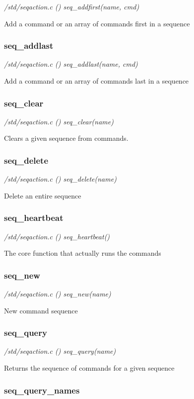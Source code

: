 {\em /std/seqaction.c () seq\_addfirst(name, cmd)}

Add a command or an array of commands first in a sequence


\subsubsection{seq\_addlast}

{\em /std/seqaction.c () seq\_addlast(name, cmd)}

Add a command or an array of commands last in a sequence 


\subsubsection{seq\_clear}

{\em /std/seqaction.c () seq\_clear(name)}

Clears a given sequence from commands.


\subsubsection{seq\_delete}

{\em /std/seqaction.c () seq\_delete(name)}

Delete an entire sequence


\subsubsection{seq\_heartbeat}

{\em /std/seqaction.c () seq\_heartbeat()}

The core function that actually runs the commands


\subsubsection{seq\_new}

{\em /std/seqaction.c () seq\_new(name)}

New command sequence


\subsubsection{seq\_query}

{\em /std/seqaction.c () seq\_query(name)}

Returns the sequence of commands for a given sequence


\subsubsection{seq\_query\_names}

